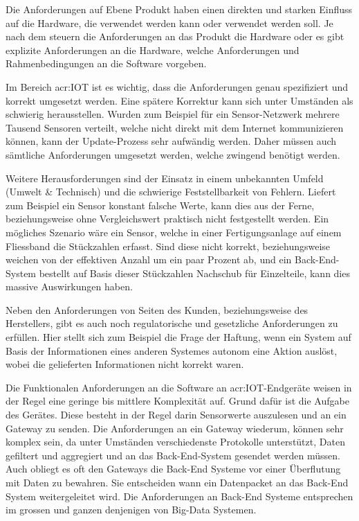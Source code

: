 Die Anforderungen auf Ebene Produkt haben einen direkten und starken Einfluss auf die Hardware, die verwendet werden kann oder verwendet werden soll. Je nach dem steuern die Anforderungen an das Produkt die Hardware oder es gibt explizite Anforderungen an die Hardware, welche Anforderungen und Rahmenbedingungen an die Software vorgeben. 

Im Bereich \gls{acr:IOT} ist es wichtig, dass die Anforderungen genau spezifiziert und korrekt umgesetzt werden. Eine spätere Korrektur kann sich unter Umständen als schwierig herausstellen. Wurden zum Beispiel für ein Sensor-Netzwerk mehrere Tausend Sensoren verteilt, welche nicht direkt mit dem Internet kommunizieren können, kann der Update-Prozess sehr aufwändig werden. Daher müssen auch sämtliche Anforderungen umgesetzt werden, welche zwingend benötigt werden.

Weitere Herausforderungen sind der Einsatz in einem unbekannten Umfeld (Umwelt \& Technisch) und die schwierige Feststellbarkeit von Fehlern. Liefert zum Beispiel ein Sensor konstant falsche Werte, kann dies aus der Ferne, beziehungsweise ohne Vergleichswert praktisch nicht festgestellt werden. Ein mögliches Szenario wäre ein Sensor, welche in einer Fertigungsanlage auf einem Fliessband die Stückzahlen erfasst. Sind diese nicht korrekt, beziehungsweise weichen von der effektiven Anzahl um ein paar Prozent ab, und ein Back-End-System bestellt auf Basis dieser Stückzahlen Nachschub für Einzelteile, kann dies massive Auswirkungen haben.

Neben den Anforderungen von Seiten des Kunden, beziehungsweise des Herstellers, gibt es auch noch regulatorische und gesetzliche Anforderungen zu erfüllen. Hier stellt sich zum Beispiel die Frage der Haftung, wenn ein System auf Basis der Informationen eines anderen Systemes autonom eine Aktion auslöst, wobei die gelieferten Informationen nicht korrekt waren.

Die Funktionalen Anforderungen an die Software an \gls{acr:IOT}-Endgeräte weisen in der Regel eine geringe bis mittlere Komplexität auf. Grund dafür ist die Aufgabe des Gerätes. Diese besteht in der Regel darin Sensorwerte auszulesen und an ein Gateway zu senden. Die Anforderungen an ein Gateway wiederum, können sehr komplex sein, da unter Umständen verschiedenste Protokolle unterstützt, Daten gefiltert und aggregiert und an das Back-End-System gesendet werden müssen. Auch obliegt es oft den Gateways die Back-End Systeme vor einer Überflutung mit Daten zu bewahren. Sie entscheiden wann ein Datenpacket an das Back-End System weitergeleitet wird. Die Anforderungen an Back-End Systeme entsprechen im grossen und ganzen denjenigen von Big-Data Systemen.



